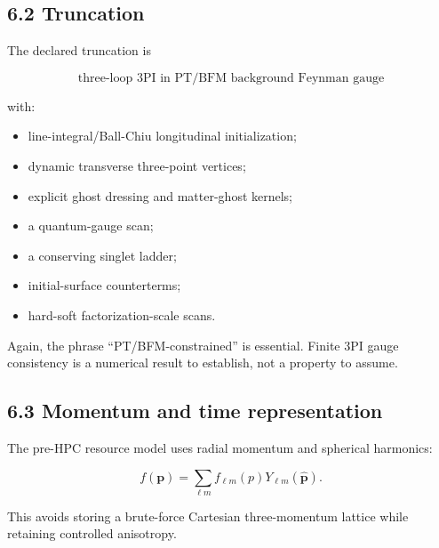 \documentclass[
  10pt,
]{article}
\providecommand{\tightlist}{%
  \setlength{\itemsep}{0pt}\setlength{\parskip}{0pt}}
\begin{document}
\subsection{6.2 Truncation}\label{truncation}

The declared truncation is

\[
\boxed{
\text{three-loop 3PI in PT/BFM background Feynman gauge}
}
\]

with:

\begin{itemize}
\tightlist
\item
  line-integral/Ball-Chiu longitudinal initialization;
\item
  dynamic transverse three-point vertices;
\item
  explicit ghost dressing and matter-ghost kernels;
\item
  a quantum-gauge scan;
\item
  a conserving singlet ladder;
\item
  initial-surface counterterms;
\item
  hard-soft factorization-scale scans.
\end{itemize}

Again, the phrase ``PT/BFM-constrained'' is essential. Finite 3PI gauge
consistency is a numerical result to establish, not a property to
assume.

\subsection{6.3 Momentum and time
representation}\label{momentum-and-time-representation}

The pre-HPC resource model uses radial momentum and spherical harmonics:

\[
f(\mathbf p)=\sum_{\ell m}f_{\ell m}(p)Y_{\ell m}(\hat{\mathbf p}).
\]

This avoids storing a brute-force Cartesian three-momentum lattice while
retaining controlled anisotropy.
\end{document}
